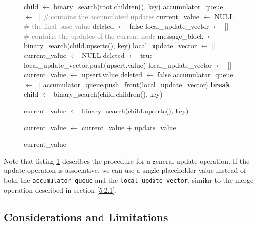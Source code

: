 \begin{figure}[h]
	\label{fig:lookup_implementation}
	\vspace*{5mm}
	\begin{algorithmic}[1]
		\State child $\leftarrow$ binary\_search(root.children(), key)
		\State accumulator\_queue $\leftarrow$ [] \space\textcolor{gray}{\# contains the accumulated updates}
		\State current\_value $\leftarrow$ NULL \space\textcolor{gray}{\# the final base value}
		\State deleted $\leftarrow$ false
		\State local\_update\_vector $\leftarrow$ [] \space\textcolor{gray}{\# contains the updates of the current node}
		\State message\_block $\leftarrow$ binary\_search(child.upserts(), key)
		\State local\_update\_vector $\leftarrow$ []
		\State current\_value $\leftarrow$ NULL
		\State deleted $\leftarrow$ true
		\State local\_update\_vector.push(upsert.value)
		\State local\_update\_vector $\leftarrow$ []
		\State current\_value $\leftarrow$ upsert.value
		\State deleted $\leftarrow$ false
		\EndIf
		\EndFor
		\State accumulator\_queue $\leftarrow$ []
		\EndIf 
		\State accumulator\_queue.push\_front(local\_update\_vector)
		\State \textbf{break}
		\EndIf
		\State child $\leftarrow$ binary\_search(child.children(), key)
		\EndWhile
		
		\State current\_value $\leftarrow$ binary\_search(child.upserts(), key)
		\EndIf
		
		\State current\_value $\leftarrow$ current\_value + update\_value
		\EndFor
		
		\State \Return current\_value
		
		\EndFunction
		\newline
	\end{algorithmic}
\end{figure}

Note that listing \ref{fig:lookup_implementation} describes the procedure for a general update operation. If the update operation is associative, we can use a single placeholder value instead of both the \texttt{accumulator\_queue} and the \texttt{local\_update\_vector}, similar to the merge operation described in section \ref{5.2.1}.

\subsection{Considerations and Limitations}\label{5.2.5}
